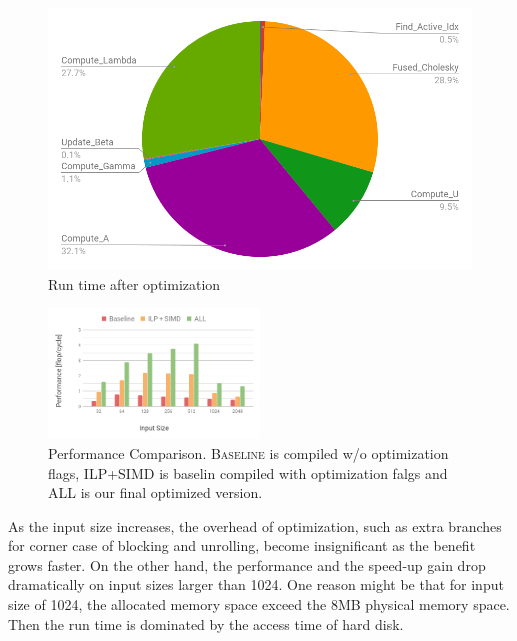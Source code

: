 \begin{figure}
\centering
  \includegraphics[scale=0.26]{./pic/pie_after.png}
  \caption{Run time after optimization}
  \label{fig:pie_after}
\end{figure}

\begin{figure}[h]
\centering
\includegraphics[width=0.5\textwidth]{./pic/performance.png}
\caption{Performance Comparison. \textsc{Baseline} is compiled w/o optimization flags, \textsc{ILP+SIMD} is baselin compiled with optimization falgs and \textsc{ALL} is our final optimized version.}
\label{fig:performance}
\end{figure}


As the input size increases, the overhead of optimization, such as extra branches for corner case of blocking and unrolling, become insignificant as the benefit grows faster. On the other hand, the performance and the speed-up gain drop dramatically on input sizes larger than 1024. One reason might be that for input size of 1024, the allocated memory space exceed the 8MB physical memory space. Then the run time is dominated by the access time of hard disk.


